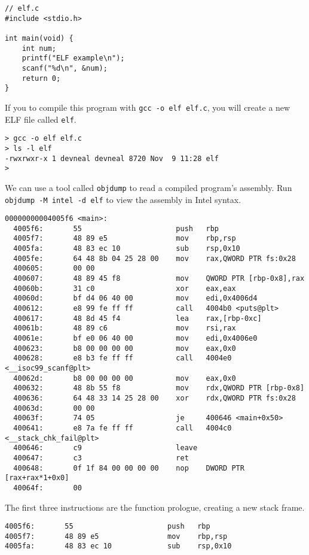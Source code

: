 \documentclass{article}
\begin{document}
\begin{lstlisting}
// elf.c 
#include <stdio.h>

int main(void) {
    int num;
    printf("ELF example\n");
    scanf("%d\n", &num);
    return 0;
}
\end{lstlisting}

If you to compile this program with \texttt{gcc -o elf elf.c}, you will create
a new ELF file called \texttt{elf}.

\begin{lstlisting}
> gcc -o elf elf.c 
> ls -l elf
-rwxrwxr-x 1 devneal devneal 8720 Nov  9 11:28 elf
> 
\end{lstlisting}

We can use a tool called \texttt{objdump} to read a compiled program's assembly.
Run \texttt{objdump -M intel -d elf} to view the assembly in Intel syntax.

\begin{lstlisting}
00000000004005f6 <main>:
  4005f6:       55                      push   rbp
  4005f7:       48 89 e5                mov    rbp,rsp
  4005fa:       48 83 ec 10             sub    rsp,0x10
  4005fe:       64 48 8b 04 25 28 00    mov    rax,QWORD PTR fs:0x28
  400605:       00 00 
  400607:       48 89 45 f8             mov    QWORD PTR [rbp-0x8],rax
  40060b:       31 c0                   xor    eax,eax
  40060d:       bf d4 06 40 00          mov    edi,0x4006d4
  400612:       e8 99 fe ff ff          call   4004b0 <puts@plt>
  400617:       48 8d 45 f4             lea    rax,[rbp-0xc]
  40061b:       48 89 c6                mov    rsi,rax
  40061e:       bf e0 06 40 00          mov    edi,0x4006e0
  400623:       b8 00 00 00 00          mov    eax,0x0
  400628:       e8 b3 fe ff ff          call   4004e0 <__isoc99_scanf@plt>
  40062d:       b8 00 00 00 00          mov    eax,0x0
  400632:       48 8b 55 f8             mov    rdx,QWORD PTR [rbp-0x8]
  400636:       64 48 33 14 25 28 00    xor    rdx,QWORD PTR fs:0x28
  40063d:       00 00 
  40063f:       74 05                   je     400646 <main+0x50>
  400641:       e8 7a fe ff ff          call   4004c0 <__stack_chk_fail@plt>
  400646:       c9                      leave  
  400647:       c3                      ret    
  400648:       0f 1f 84 00 00 00 00    nop    DWORD PTR [rax+rax*1+0x0]
  40064f:       00
\end{lstlisting}

The first three instructions are the function prologue, creating a new stack
frame.
\begin{lstlisting}
4005f6:       55                      push   rbp
4005f7:       48 89 e5                mov    rbp,rsp
4005fa:       48 83 ec 10             sub    rsp,0x10
\end{lstlisting}
\end{document}

